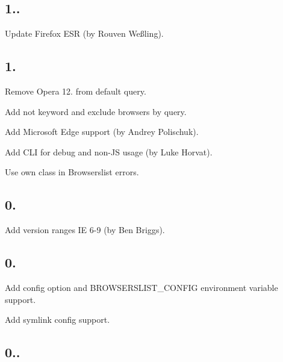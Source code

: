 \subsection*{1..}


\begin{DoxyItemize}
\item Update Firefox E\+SR (by Rouven Weßling).
\end{DoxyItemize}

\subsection*{1.}


\begin{DoxyItemize}
\item Remove Opera 12. from default query.
\item Add {\ttfamily not} keyword and exclude browsers by query.
\item Add Microsoft Edge support (by Andrey Polischuk).
\item Add C\+LI for debug and non-\/\+JS usage (by Luke Horvat).
\item Use own class in Browserslist errors.
\end{DoxyItemize}

\subsection*{0.}


\begin{DoxyItemize}
\item Add version ranges {\ttfamily IE 6-\/9} (by Ben Briggs).
\end{DoxyItemize}

\subsection*{0.}


\begin{DoxyItemize}
\item Add {\ttfamily config} option and {\ttfamily B\+R\+O\+W\+S\+E\+R\+S\+L\+I\+S\+T\+\_\+\+C\+O\+N\+F\+IG} environment variable support.
\item Add symlink config support.
\end{DoxyItemize}

\subsection*{0..}


